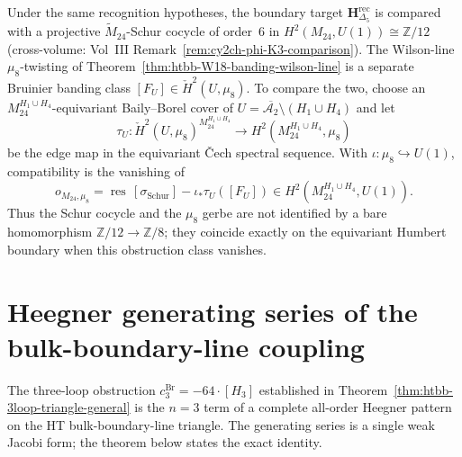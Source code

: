 \begin{remark}
\label{rem:htbb-mu8-schur-cocycle}
Under the same recognition hypotheses, the boundary target
$\mathbf{H}_{\Delta_5}^{\mathrm{rec}}$ is compared with a projective
$\widetilde{M}_{24}$-Schur cocycle of order~$6$ in
$H^2(M_{24},U(1))\cong\mathbb Z/12$ \textup{(}cross-volume: Vol~III
Remark~\ref{rem:cy2ch-phi-K3-comparison}\textup{).} The Wilson-line
$\mu_8$-twisting of Theorem~\ref{thm:htbb-W18-banding-wilson-line} is a
separate Bruinier banding class
$[F_U]\in \check H^2(U,\mu_8)$. To compare the two, choose an
$M_{24}^{H_1\cup H_4}$-equivariant Baily--Borel cover of
$U=\overline{\mathcal A_2}\setminus(H_1\cup H_4)$ and let
\[
 \tau_U:\check H^2(U,\mu_8)^{M_{24}^{H_1\cup H_4}}
 \longrightarrow H^2(M_{24}^{H_1\cup H_4},\mu_8)
\]
be the edge map in the equivariant \v Cech spectral sequence. With
$\iota:\mu_8\hookrightarrow U(1)$, compatibility is the vanishing of
\[
 o_{M_{24},\mu_8}
 =
 \operatorname{res}\,[\sigma_{\mathrm{Schur}}]
 -
 \iota_\ast\tau_U([F_U])
 \in H^2(M_{24}^{H_1\cup H_4},U(1)).
\]
Thus the Schur cocycle and the $\mu_8$ gerbe are not identified by a
bare homomorphism $\mathbb Z/12\to\mathbb Z/8$; they coincide exactly
on the equivariant Humbert boundary when this obstruction class
vanishes.
\end{remark}

\section{Heegner generating series of the bulk-boundary-line coupling}
\label{sec:htbb-heegner-generating-series}

The three-loop obstruction \(c^{\mathrm{Br}}_3 = -64\cdot[H_3]\) established in
Theorem~\ref{thm:htbb-3loop-triangle-general} is the
$n = 3$ term of a complete all-order Heegner pattern on the HT
bulk-boundary-line triangle. The generating series is a single weak
Jacobi form; the theorem below states the exact identity.

